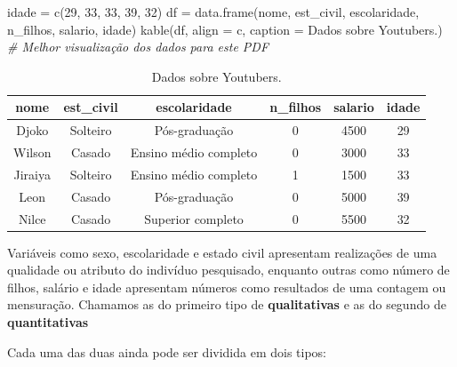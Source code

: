 \documentclass[
]{book}
\newenvironment{Shaded}{\begin{snugshade}}{\end{snugshade}}
\newcommand{\AttributeTok}[1]{\textcolor[rgb]{0.77,0.63,0.00}{#1}}
\newcommand{\CommentTok}[1]{\textcolor[rgb]{0.56,0.35,0.01}{\textit{#1}}}
\newcommand{\DecValTok}[1]{\textcolor[rgb]{0.00,0.00,0.81}{#1}}
\newcommand{\FunctionTok}[1]{\textcolor[rgb]{0.00,0.00,0.00}{#1}}
\newcommand{\NormalTok}[1]{#1}
\newcommand{\OtherTok}[1]{\textcolor[rgb]{0.56,0.35,0.01}{#1}}
\newcommand{\StringTok}[1]{\textcolor[rgb]{0.31,0.60,0.02}{#1}}
\begin{document}
\begin{Shaded}
\begin{Highlighting}[]
\NormalTok{idade }\OtherTok{=} \FunctionTok{c}\NormalTok{(}\DecValTok{29}\NormalTok{, }\DecValTok{33}\NormalTok{, }\DecValTok{33}\NormalTok{, }\DecValTok{39}\NormalTok{, }\DecValTok{32}\NormalTok{)}
\NormalTok{df }\OtherTok{=} \FunctionTok{data.frame}\NormalTok{(nome, est\_civil, escolaridade, n\_filhos, salario, idade)}
\FunctionTok{kable}\NormalTok{(df, }\AttributeTok{align =} \StringTok{\textquotesingle{}c\textquotesingle{}}\NormalTok{,}
      \AttributeTok{caption =} \StringTok{\textquotesingle{}Dados sobre Youtubers.\textquotesingle{}}\NormalTok{) }\CommentTok{\# Melhor visualização dos dados para este PDF}
\end{Highlighting}
\end{Shaded}

\begin{table}

\caption{\label{tab:youtubers}Dados sobre Youtubers.}
\centering
\begin{tabular}[t]{c|c|c|c|c|c}
\hline
nome & est\_civil & escolaridade & n\_filhos & salario & idade\\
\hline
Djoko & Solteiro & Pós-graduação & 0 & 4500 & 29\\
\hline
Wilson & Casado & Ensino médio completo & 0 & 3000 & 33\\
\hline
Jiraiya & Solteiro & Ensino médio completo & 1 & 1500 & 33\\
\hline
Leon & Casado & Pós-graduação & 0 & 5000 & 39\\
\hline
Nilce & Casado & Superior completo & 0 & 5500 & 32\\
\hline
\end{tabular}
\end{table}

Variáveis como sexo, escolaridade e estado civil apresentam realizações de uma qualidade ou atributo do indivíduo pesquisado, enquanto outras como número de filhos, salário e idade apresentam números como resultados de uma contagem ou mensuração. Chamamos as do primeiro tipo de \textbf{qualitativas} e as do segundo de \textbf{quantitativas}

Cada uma das duas ainda pode ser dividida em dois tipos:
\end{document}

